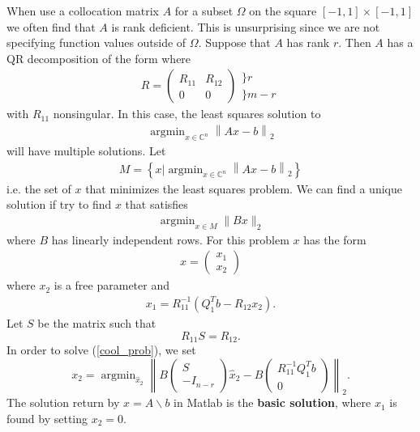 \documentclass{article}
\DeclareMathOperator*{\argmin}{argmin}
\newcommand{\C}{\mathbb{C}}
\begin{document}
When use a collocation matrix $A$ for a subset $\Omega$ on the square $[-1,1] \times [-1,1]$ we often find that $A$ is rank deficient. This is unsurprising since we are not specifying function values outside of $\Omega$. Suppose that $A$ has rank $r$. Then $A$ has a QR decomposition of the form where
\begin{align}
R = \begin{pmatrix}
 R_{11} & R_{12} \\
 0 & 0
 \end{pmatrix}
 \begin{array}{l}
 \} r \\
 \} m-r
 \end{array}
\end{align}
 with $R_{11}$ nonsingular. In this case, the least squares solution to
 \begin{align}
 \argmin_{x \in \C^n} \left \| Ax-b\right \|_2
 \end{align}
will have multiple solutions. Let
\begin{align}
M = \left \{ x |  \argmin_{x \in \C^n} \left \| Ax-b\right \|_2 \right \}
\end{align}
i.e. the set of $x$ that minimizes the least squares problem. We can find a unique solution if try to find $x$ that satisfies
\begin{align}
\argmin_{x \in M} \| B x \|_2
\label{cool_prob}
\end{align}
where $B$ has linearly independent rows. For this problem $x$ has the form
\begin{align}
x = \begin{pmatrix}
 x_1 \\
 x_2
 \end{pmatrix}
\end{align}
where $x_2$ is a free parameter and 
\begin{align}
x_1 = R_{11}^{-1}(Q_1^{T}b-R_{12}x_2).
\end{align}
Let $S$ be the matrix such that
\begin{equation}
R_{11} S = R_{12}.
\end{equation}
In order to solve (\ref{cool_prob}), we set
\begin{equation}
x_2 = \argmin_{\hat{x}_2}\left \| B \begin{pmatrix} S \\ -I_{n-r} \end{pmatrix} \hat{x}_2 - B \begin{pmatrix} R_{11}^{-1}Q_1^{T}b \\ 0 \end{pmatrix}
\right \|_2.
\end{equation}
The solution return by $x=A\backslash b$ in Matlab is the \textbf{basic solution}, where $x_1$ is found by setting $x_2=0$.
\end{document}
